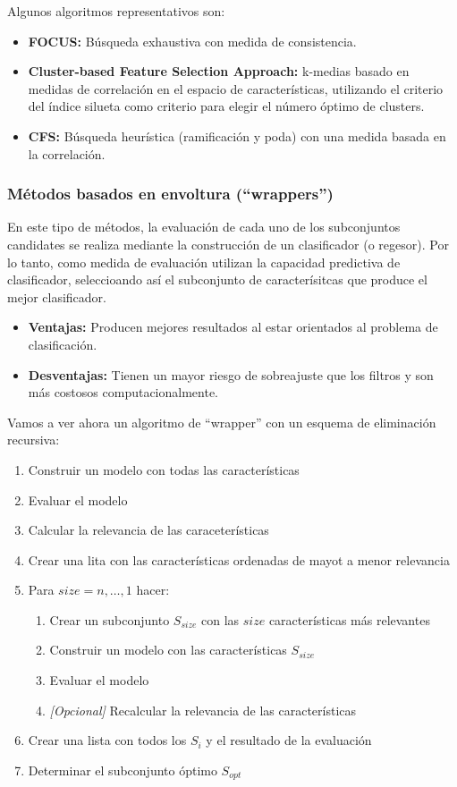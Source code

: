 \documentclass[12pt, letterpaper]{article}
\begin{document}
Algunos algoritmos representativos son:
\begin{itemize}
    \item \textbf{FOCUS:} Búsqueda exhaustiva con medida de consistencia.
    \item \textbf{Cluster-based Feature Selection Approach:} k-medias basado en medidas de correlación en el espacio de características, utilizando el criterio del índice silueta como criterio para elegir el número óptimo de clusters.
    \item \textbf{CFS:} Búsqueda heurística (ramificación y poda) con una medida basada en la correlación.
\end{itemize}

\subsubsection{Métodos basados en envoltura (``wrappers'')}
En este tipo de métodos, la evaluación de cada uno de los subconjuntos candidates se realiza mediante la construcción de un clasificador (o regesor). Por lo tanto, como medida de evaluación utilizan la capacidad predictiva de clasificador, seleccioando así el subconjunto de caracterísitcas que produce el mejor clasificador. 

\begin{itemize}
    \item \textbf{Ventajas:} Producen mejores resultados al estar orientados al problema de clasificación.
    \item \textbf{Desventajas:} Tienen un mayor riesgo de sobreajuste que los filtros y son más costosos computacionalmente.
\end{itemize}

Vamos a ver ahora un algoritmo de ``wrapper'' con un esquema de eliminación recursiva:
\begin{enumerate}
    \item Construir un modelo con todas las características
    \item Evaluar el modelo
    \item Calcular la relevancia de las caraceterísticas
    \item Crear una lita con las características ordenadas de mayot a menor relevancia
    \item Para $size = {n,\dots,1}$ hacer:
    \begin{enumerate}
        \item Crear un subconjunto $S_{size}$ con las $size$ características más relevantes
        \item Construir un modelo con las características $S_{size}$
        \item Evaluar el modelo
        \item \textit{[Opcional]} Recalcular la relevancia de las características
    \end{enumerate}
    \item Crear una lista con todos los $S_i$ y el resultado de la evaluación
    \item Determinar el subconjunto óptimo $S_{opt}$
\end{enumerate}
\end{document}
